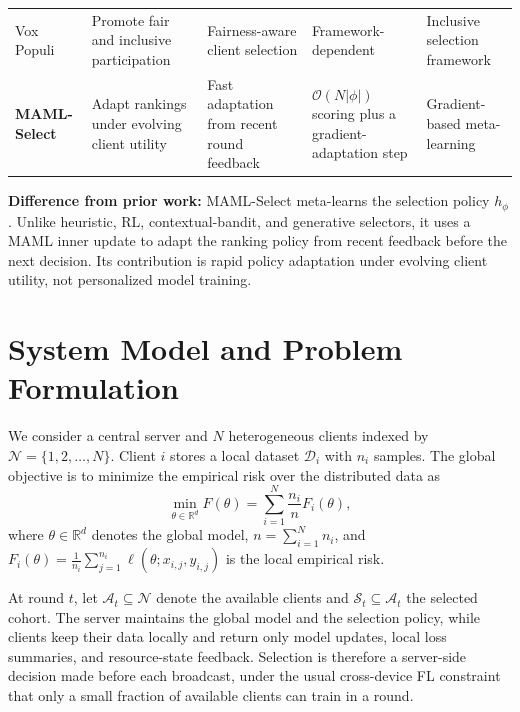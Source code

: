 \documentclass[journal]{IEEEtran}
\newcommand{\revision}[1]{#1}
\begin{document}
\begin{table}[!t]
\begin{tabularx}{\textwidth}{lXXXX}
        Vox Populi~\cite{arisdakessian2026vox} & Promote fair and inclusive participation & Fairness-aware client selection & Framework-dependent & Inclusive selection framework \\
        \textbf{MAML-Select} & Adapt rankings under evolving client utility & Fast adaptation from recent round feedback & $\mathcal{O}(N|\phi|)$ scoring plus a gradient-adaptation step & Gradient-based meta-learning \\
        \bottomrule
    \end{tabularx}
\end{table}

\revision{\textbf{Difference from prior work:} MAML-Select meta-learns the selection policy $h_\phi$. Unlike heuristic, RL, contextual-bandit, and generative selectors, it uses a MAML inner update to adapt the ranking policy from recent feedback before the next decision. Its contribution is rapid policy adaptation under evolving client utility, not personalized model training.}

\section{System Model and Problem Formulation}
\revision{We consider a central server and $N$ heterogeneous clients indexed by $\mathcal{N} = \{1, 2, \ldots, N\}$. Client $i$ stores a local dataset $\mathcal{D}_i$ with $n_i$ samples.} The global objective is to minimize the empirical risk over the distributed data as
\begin{equation}
	\min_{\theta \in \mathbb{R}^d} F(\theta) = \sum_{i=1}^{N} \frac{n_i}{n} F_i(\theta),
	\label{eq:global_objective}
\end{equation}
\revision{where $\theta \in \mathbb{R}^d$ denotes the global model, $n = \sum_{i=1}^{N} n_i$, and $F_i(\theta) = \frac{1}{n_i} \sum_{j=1}^{n_i} \ell(\theta; x_{i,j}, y_{i,j})$ is the local empirical risk.}

\revision{At round $t$, let $\mathcal{A}_t \subseteq \mathcal{N}$ denote the available clients and $\mathcal{S}_t \subseteq \mathcal{A}_t$ the selected cohort. The server maintains the global model and the selection policy, while clients keep their data locally and return only model updates, local loss summaries, and resource-state feedback. Selection is therefore a server-side decision made before each broadcast, under the usual cross-device FL constraint that only a small fraction of available clients can train in a round.}
\end{document}
